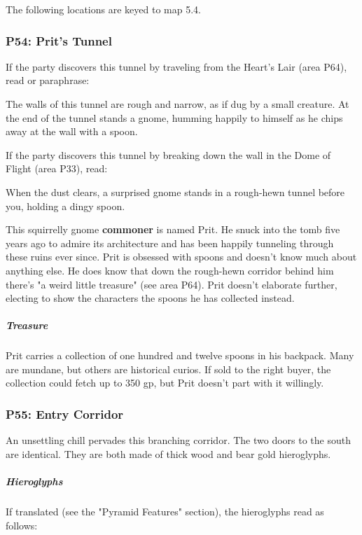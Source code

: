 \documentclass[10pt,a4paper,twoside,bg=print,twocolumn,openany,nodeprecatedcode]{dndbook}
\begin{document}
The following locations are keyed to map 5.4.

\subsubsection{P54: Prit's Tunnel}
If the party discovers this tunnel by traveling from the Heart's Lair (area P64), read or paraphrase:

\begin{DndReadAloud}{}
The walls of this tunnel are rough and narrow, as if dug by a small creature. At the end of the tunnel stands a gnome, humming happily to himself as he chips away at the wall with a spoon.

\end{DndReadAloud}

If the party discovers this tunnel by breaking down the wall in the Dome of Flight (area P33), read:

\begin{DndReadAloud}{}
When the dust clears, a surprised gnome stands in a rough-hewn tunnel before you, holding a dingy spoon.

\end{DndReadAloud}

This squirrelly gnome \textbf{commoner} is named Prit. He snuck into the tomb five years ago to admire its architecture and has been happily tunneling through these ruins ever since. Prit is obsessed with spoons and doesn't know much about anything else. He does know that down the rough-hewn corridor behind him there's "a weird little treasure" (see area P64). Prit doesn't elaborate further, electing to show the characters the spoons he has collected instead.

\subparagraph{Treasure}
Prit carries a collection of one hundred and twelve spoons in his backpack. Many are mundane, but others are historical curios. If sold to the right buyer, the collection could fetch up to 350 gp, but Prit doesn't part with it willingly.

\subsubsection{P55: Entry Corridor}
An unsettling chill pervades this branching corridor. The two doors to the south are identical. They are both made of thick wood and bear gold hieroglyphs.

\subparagraph{Hieroglyphs}
If translated (see the "Pyramid Features" section), the hieroglyphs read as follows:
\end{document}

